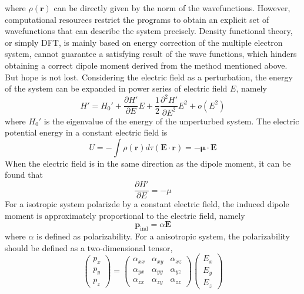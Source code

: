 \documentclass[%
 reprint,
 amsmath,amssymb,
 aps,
10.5pt,
]{revtex4-1}
\begin{document}
where $\rho(\mathbf{r})$ can be directly given by the norm of the wavefunctions.
However, computational resources restrict the
programs to obtain an explicit set of wavefunctions that
can describe the system precisely. Density functional theory,
or simply DFT, is mainly based on energy correction
of the multiple electron system, cannot guarantee a
satisfying result of the wave functions, which hinders obtaining
a correct dipole moment derived from the method
mentioned above. But hope is not lost. Considering the electric field as a perturbation, the energy of the system can be expanded in power series of electric field $E$, namely
\begin{equation}
	H' = H_0' + \frac{\partial H'}{\partial E} E + \frac{1}{2} \frac{ \partial^2 H'}{\partial E^2} E^2 + o(E^2)
	\label{expand}
\end{equation}
where $H_0'$ is the eigenvalue of the energy of the unperturbed system. The electric potential energy in a constant electric field is
 \begin{equation}
 	U = - \int \rho(\mathbf{r})d \tau (\mathbf{E} \cdot \mathbf{r}) = - \mathbf{\mu} \cdot \mathbf{E}
\label{dipolepotential}
 \end{equation}
 When the electric field is in the same direction as the dipole moment, it can be found that 
 \begin{equation}
 	\frac{\partial H'}{\partial E} = - \mu
 \end{equation}
 For a isotropic system polarizde by a constant electric field, the induced dipole moment is approximately proportional to the electric field, namely
 \begin{equation}
 	\mathbf{p}_\text{ind} = \alpha \mathbf{E}
 \end{equation}
 where $\alpha$ is defined as polarizability. For a anisotropic system, the polarizability should be defined as a two-dimensional tensor,
 \begin{equation}
  	\begin{pmatrix}
  	p_x \\
  	p_y \\
  	p_z
  	\end{pmatrix} =
  	\begin{pmatrix}
  	\alpha_{xx} & \alpha_{xy} & \alpha_{xz} \\
  	\alpha_{yx} & \alpha_{yy} & \alpha_{yz} \\
  	\alpha_{zx} & \alpha_{zy} & \alpha_{zz}
  	\end{pmatrix}
  	\begin{pmatrix}
  	E_x\\
  	E_y\\
  	E_z
  	\end{pmatrix}
  \end{equation} 
\end{document}
